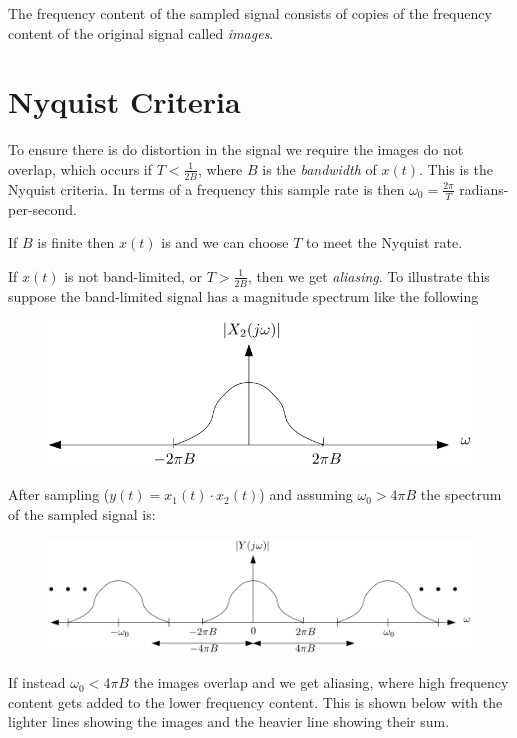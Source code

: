 \documentclass{article}
\begin{document}
The frequency content of the sampled signal consists of copies of the frequency content of the original signal called \textit{images}.

\section{Nyquist Criteria}

To ensure there is do distortion in the signal we require the images do not overlap, which occurs if $T < \frac{1}{2B}$, where $B$ is the \textit{bandwidth} of $x(t)$. This is the Nyquist criteria. In terms of a frequency this sample rate is then $\omega_0 = \tfrac{2\pi}{T}$ radians-per-second.

If $B$ is finite then $x(t)$ is  and we can choose $T$ to meet the Nyquist rate.

If $x(t)$ is not band-limited, or $T > \frac{1}{2B}$, then we get \textit{aliasing}. To illustrate this suppose the band-limited signal has a magnitude spectrum like the following

\begin{figure}
  \centering
  \includegraphics[width=0.8\linewidth, alt="cartoon of the magnitude spectrum of a band-limited signal"]{bandlimited.svg}
\end{figure}

After sampling ($y(t) = x_1(t)\cdot x_2(t)$) and assuming $\omega_0 > 4\pi B$ the spectrum of the sampled signal is:

\begin{figure}
  \centering
  \includegraphics[width=0.8\linewidth, alt="cartoon of the magnitude spectrum of a band-limited signal after sampling at the Nyquist rate"]{bandlimitedsampled1.svg}
\end{figure}

If instead $\omega_0 < 4\pi B$ the images overlap and we get aliasing, where high frequency content gets added to the lower frequency content. This is shown below with the lighter lines showing the images and the heavier line showing their sum.
\end{document}
